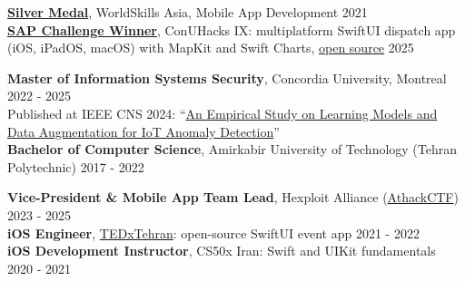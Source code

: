 {\small
\textbf{\href{https://drive.google.com/file/d/1qbIPxlVEKAE1nXXwvUrfQDtBS61PDtff/view}{Silver Medal}}, WorldSkills Asia, Mobile App Development \hfill 2021\\[2pt]
\textbf{\href{https://devpost.com/software/quebec-firefighters}{SAP Challenge Winner}}, ConUHacks IX: multiplatform SwiftUI dispatch app (iOS, iPadOS, macOS) with MapKit and Swift Charts, \href{https://github.com/alireza12t/ConUHack2025-Quebec-Firefighters-iOS-App}{open source} \hfill 2025
\par}

{\small
\textbf{Master of Information Systems Security}, Concordia University, Montreal \hfill 2022 - 2025\\
\hspace*{1em}Published at IEEE CNS 2024: ``\href{https://ieeexplore.ieee.org/abstract/document/10735681}{An Empirical Study on Learning Models and Data Augmentation for IoT Anomaly Detection}''\\[2pt]
\textbf{Bachelor of Computer Science}, Amirkabir University of Technology (Tehran Polytechnic) \hfill 2017 - 2022
\par}

{\small
\textbf{Vice-President \& Mobile App Team Lead}, Hexploit Alliance (\href{https://athackctf.com}{AthackCTF}) \hfill 2023 - 2025\\[2pt]
\textbf{iOS Engineer}, \href{https://github.com/TEDxTehran-Team/event-app-ios}{TEDxTehran}: open-source SwiftUI event app \hfill 2021 - 2022\\[2pt]
\textbf{iOS Development Instructor}, CS50x Iran: Swift and UIKit fundamentals \hfill 2020 - 2021
\par}
